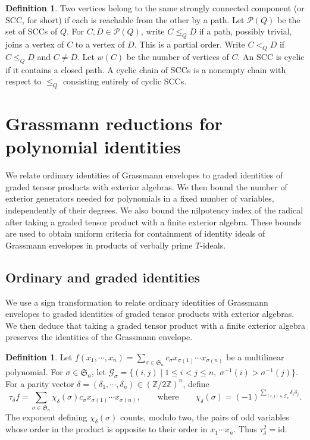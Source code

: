 \documentclass[11pt,reqno]{amsart}
\newcommand{\Ztwo}{\mathbb Z/2\mathbb Z}
\theoremstyle{definition}
\newtheorem{definition}[theorem]{Definition}
\theoremstyle{remark}
\numberwithin{equation}{section}
\begin{document}
\begin{definition}\label{def:quiver-components}
Two vertices belong to the same strongly connected component (or SCC, for short)
if each is reachable from the other by a path.
Let $\mathcal P(Q)$ be the set of SCCs of $Q$.
For $C,D\in\mathcal P(Q)$, write $C\leq_Q D$ if a path, possibly
trivial, joins a vertex of $C$ to a vertex of $D$.
This is a partial order. Write $C<_Q D$ if $C\leq_Q D$ and $C\ne D$.
Let $w(C)$ be the number of vertices of $C$.
An SCC is cyclic if it contains a closed path.
A cyclic chain of SCCs is a nonempty chain with respect to $\leq_Q$ consisting entirely of cyclic SCCs.
\end{definition}



\section{Grassmann reductions for polynomial identities}\label{sec:grassmann}

We relate ordinary identities of Grassmann envelopes to graded
identities of graded tensor products with exterior algebras.
We then bound the number of exterior generators needed for
polynomials in a fixed number of variables, independently of
their degrees. We also bound the nilpotency index of the radical
after taking a graded tensor product with a finite exterior algebra.
These bounds are used to obtain uniform criteria for containment
of identity ideals of Grassmann envelopes in products of verbally
prime $T$-ideals.


\subsection{Ordinary and graded identities}\label{subsec:ordinary-graded-identities}

We use a sign transformation to relate ordinary identities of
Grassmann envelopes to graded identities of graded  tensor products with
exterior algebras. We then deduce that taking a graded tensor product
with a finite exterior algebra preserves the identities of the
Grassmann envelope.

\begin{definition}\label{def:sign-transformation}
Let $
f(x_1,\cdots,x_n)
=\sum_{\sigma\in\mathfrak S_n}
c_\sigma x_{\sigma(1)}\cdots x_{\sigma(n)}$
be a multilinear polynomial. 
For $\sigma\in\mathfrak S_n$, let
$
\mathcal G_\sigma
=
\{(i,j)\mid 1\leq i<j\leq n,\;
\sigma^{-1}(i)>\sigma^{-1}(j)\}$.
For a parity vector
$\delta=(\delta_1,\cdots,\delta_n)\in(\Ztwo)^n$, define
\[
\tau_\delta f
=
\sum_{\sigma\in\mathfrak S_n}
\chi_\delta(\sigma)c_\sigma
x_{\sigma(1)}\cdots x_{\sigma(n)},
\qquad\text{where}\qquad
\chi_\delta(\sigma)
=
(-1)^{\displaystyle
\sum\limits_{(i,j)\in\mathcal G_\sigma}
\delta_i\delta_j}.
\]
The exponent defining $\chi_\delta(\sigma)$ counts, modulo two, the pairs of odd variables
whose order in the product is opposite to their order in
$x_1\cdots x_n$. Thus $\tau_\delta^2=\mathrm{id}$.
\end{definition}
\end{document}

